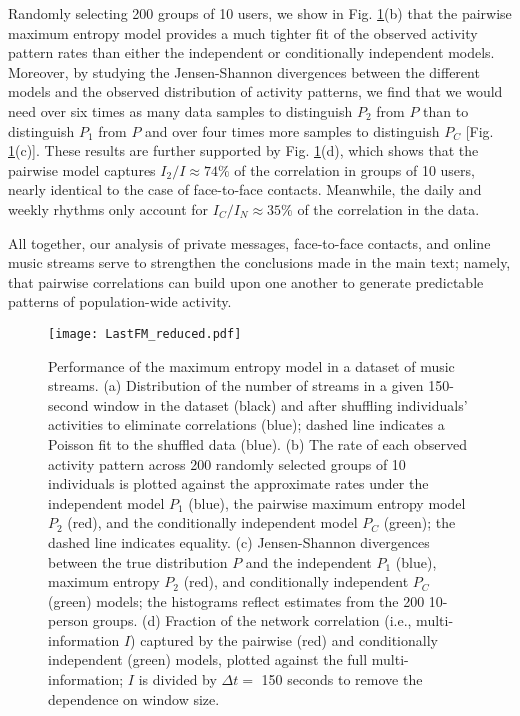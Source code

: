\documentclass[aps,reprint,superscriptaddress,amsmath,amssymb,longbibliography]{revtex4-1}
\begin{document}
Randomly selecting 200 groups of 10 users, we show in Fig. \ref{LastFM_fig}(b) that the pairwise maximum entropy model provides a much tighter fit of the observed activity pattern rates than either the independent or conditionally independent models. Moreover, by studying the Jensen-Shannon divergences between the different models and the observed distribution of activity patterns, we find that we would need over six times as many data samples to distinguish $P_2$ from $P$ than to distinguish $P_1$ from $P$ and over four times more samples to distinguish $P_C$ [Fig. \ref{LastFM_fig}(c)]. These results are further supported by Fig. \ref{LastFM_fig}(d), which shows that the pairwise model captures $I_2/I \approx 74\%$ of the correlation in groups of 10 users, nearly identical to the case of face-to-face contacts. Meanwhile, the daily and weekly rhythms only account for $I_C/I_N \approx 35\%$ of the correlation in the data.

All together, our analysis of private messages, face-to-face contacts, and online music streams serve to strengthen the conclusions made in the main text; namely, that pairwise correlations can build upon one another to generate predictable patterns of population-wide activity.

\begin{figure}
\texttt{[image: LastFM\_reduced.pdf]}
\caption{\label{LastFM_fig} Performance of the maximum entropy model in a dataset of music streams. (a) Distribution of the number of streams in a given 150-second window in the dataset (black) and after shuffling individuals' activities to eliminate correlations (blue); dashed line indicates a Poisson fit to the shuffled data (blue). (b) The rate of each observed activity pattern across 200 randomly selected groups of 10 individuals is plotted against the approximate rates under the independent model $P_1$ (blue), the pairwise maximum entropy model $P_2$ (red), and the conditionally independent model $P_C$ (green); the dashed line indicates equality. (c) Jensen-Shannon divergences between the true distribution $P$ and the independent $P_1$ (blue), maximum entropy $P_2$ (red), and conditionally independent $P_C$ (green) models; the histograms reflect estimates from the 200 10-person groups. (d) Fraction of the network correlation (i.e., multi-information $I$) captured by the pairwise (red) and conditionally independent (green) models, plotted against the full multi-information; $I$ is divided by $\Delta t = $ 150 seconds to remove the dependence on window size.}
\end{figure}
\end{document}
